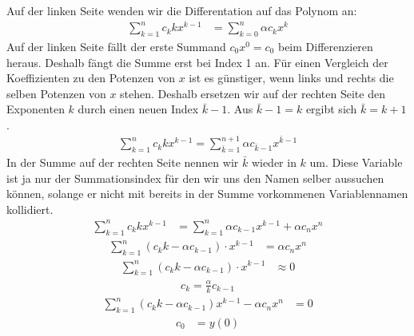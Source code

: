 \documentclass{article}
\let\l\left\let\r\right\let\cs\csname\let\ecs\endcsname\let\ea\expandafter
\begin{document}
Auf der linken Seite wenden wir die Differentation auf das Polynom an:
\begin{align*}
  \sum_{k=1}^n c_k k x^{k-1} &= \sum_{k=0}^n  \alpha c_k x^k
\end{align*}
Auf der linken Seite fällt der erste Summand $c_0x^0=c_0$ beim Differenzieren heraus. Deshalb fängt die Summe erst bei Index 1 an. Für einen Vergleich der Koeffizienten zu den Potenzen von $x$ ist es günstiger, wenn links und rechts die selben Potenzen von $x$ stehen. Deshalb ersetzen wir auf der rechten Seite den Exponenten $k$ durch einen neuen Index $\bar k-1$. Aus $\bar k-1 = k$ ergibt sich $\bar k=k+1$.
\begin{align*}
  \sum_{k = 1}^{n} c_k k x^{k-1} = \sum_{\bar k=1}^{n+1}  \alpha c_{\bar k-1} x^{\bar k-1}
\end{align*}
In der Summe auf der rechten Seite nennen wir $\bar k$ wieder in $k$ um. Diese Variable ist ja nur der Summationsindex für den wir uns den Namen selber aussuchen können, solange er nicht mit bereits in der Summe vorkommenen Variablennamen kollidiert.
\begin{align*}
  \sum_{k=1}^n c_k k x^{k-1} &= \sum_{k=1}^n \alpha c_{k-1} x^{k-1} + \alpha c_n x^n
\end{align*}
\begin{align*}
  \sum_{k=1}^n \l(c_kk - \alpha c_{k-1}\r)\cdot x^{k-1} &= \alpha c_n x^n
\end{align*}
\begin{align*}
  \sum_{k=1}^n \l(c_kk - \alpha c_{k-1}\r)\cdot x^{k-1} &\approx 0
\end{align*}
\begin{align*}
  c_{k} = \frac{\alpha}{k} c_{k-1}
\end{align*}
\begin{align*}
  \sum_{k=1}^{n} \l( c_{k} k- \alpha c_{k-1}\r) x^{k-1} - \alpha c_nx^n &= 0
\end{align*}
\begin{align*}
  c_0 &= y(0)
\end{align*}
\end{document}
